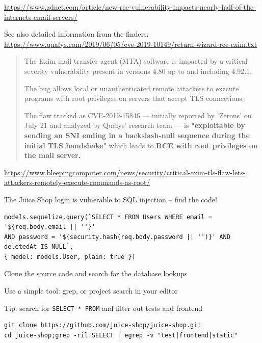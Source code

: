\documentclass[Screen16to9,17pt]{foils}
\begin{document}
{\footnotesize\url{https://www.zdnet.com/article/new-rce-vulnerability-impacts-nearly-half-of-the-internets-email-servers/}}

See also detailed information from the finders:\\ \url{https://www.qualys.com/2019/06/05/cve-2019-10149/return-wizard-rce-exim.txt}


\begin{quote}
The Exim mail transfer agent (MTA) software is impacted by a critical severity vulnerability present in versions 4.80 up to and including 4.92.1.

The bug allows local or unauthenticated remote attackers to execute programs with root privileges on servers that accept TLS connections.

The flaw tracked as CVE-2019-15846 — initially reported by 'Zerons' on July 21 and analyzed by Qualys' research team — is \textbf{"exploitable by sending an SNI ending in a backslash-null sequence during the initial TLS handshake"} which leads to \textbf{RCE with root privileges on the mail server.}
\end{quote}

\url{https://www.bleepingcomputer.com/news/security/critical-exim-tls-flaw-lets-attackers-remotely-execute-commands-as-root/}






The Juice Shop login is vulnerable to SQL injection -- find the code!

\begin{verbatim}
models.sequelize.query(`SELECT * FROM Users WHERE email = '${req.body.email || ''}'
AND password = '${security.hash(req.body.password || '')}' AND deletedAt IS NULL`,
{ model: models.User, plain: true })
\end{verbatim}


\begin{list2}
\item Clone the source code and search for the database lookups
\item Use a simple tool: grep, or project search in your editor
\item Tip: search for \verb+SELECT * FROM+ and filter out tests and frontend
\end{list2}

\begin{verbatim}
git clone https://github.com/juice-shop/juice-shop.git
cd juice-shop;grep -ril SELECT | egrep -v "test|frontend|static"
\end{verbatim}
\end{document}

